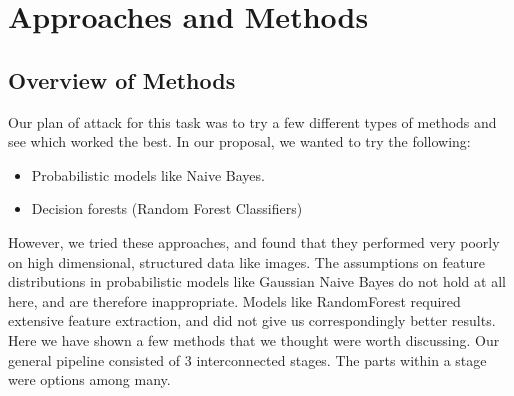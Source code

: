\section{Approaches and Methods}

\subsection{Overview of Methods}
Our plan of attack for this task was to try a few different types of methods and see which worked the best. In our proposal, we wanted to try the following:
\begin{itemize}
	\item Probabilistic models like Naive Bayes.
	\item Decision forests (Random Forest Classifiers)
\end{itemize}

However, we tried these approaches, and found that they performed very poorly on high dimensional, structured data like images. The assumptions on feature distributions in probabilistic models like Gaussian Naive Bayes do not hold at all here, and are therefore inappropriate. Models like RandomForest required extensive feature extraction, and did not give us correspondingly better results. Here we have shown a few methods that we thought were worth discussing. Our general pipeline consisted of 3 interconnected stages. The parts within a stage were options among many.
 
